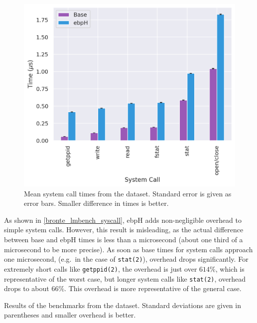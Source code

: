 \documentclass[
  12pt]{findlay}
\newcommand{\passthrough}[1]{#1}
\begin{document}
\begin{figure}
    \caption[Mean system call times from the  dataset]{
        Mean system call times from the  dataset.
        Standard error is given as error bars.
        Smaller difference in times is better.
    }
    \label{bronte_lmbench_syscall_graph}
    \includegraphics[width=.6\textwidth]{../data/bench/bronte-lmbench/syscall_times.png}
\end{figure}

As shown in \autoref{bronte_lmbench_syscall}, ebpH adds non-negligible
overhead to simple system calls. However, this result is misleading, as
the actual difference between base and ebpH times is less than a
microsecond (about one third of a microsecond to be more precise). As
soon as base times for system calls approach one microsecond, (e.g.~in
the case of \passthrough{\lstinline!stat(2)!}), overhead drops
significantly. For extremely short calls like
\passthrough{\lstinline!getppid(2)!}, the overhead is just over
\(614\%\), which is representative of the worst case, but longer system
calls like \passthrough{\lstinline!stat(2)!}, overhead drops to about
\(66\%\). This overhead is more representative of the general case.

\begin{table}[b!]
    \caption[Results of the  benchmarks from the  dataset]{
        Results of the  benchmarks from the  dataset.
        Standard deviations are given in parentheses and smaller overhead is better.
    }
    \label{bronte_lmbench_select}
    
\end{table}
\end{document}
